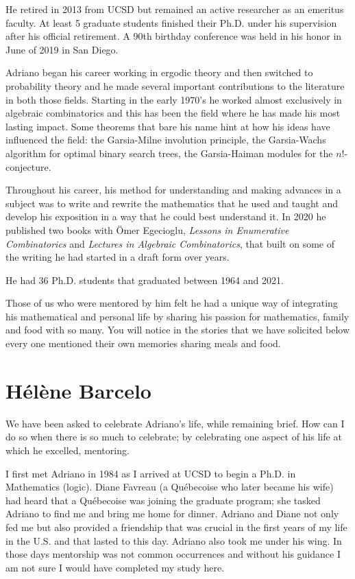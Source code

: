 \documentclass{notices}
\begin{document}
He retired in 2013 from UCSD but remained an active researcher as an emeritus faculty.  At least 5 graduate students finished their Ph.D. under his supervision after his official retirement.  A 90th birthday conference was held in his honor in June of 2019 in San Diego.

Adriano began his career working in ergodic theory and then switched to probability theory and he made several important contributions to the literature in both those fields.  Starting in the early 1970's he worked almost exclusively in algebraic
combinatorics and this has been the field where he has made his most lasting impact.  Some theorems that bare his name hint at how his ideas have influenced the field: the Garsia-Milne involution principle, the Garsia-Wachs algorithm for optimal binary search trees, the Garsia-Haiman modules for the $n!$-conjecture.

Throughout his career, his method for understanding and making advances in a subject was to write and rewrite the mathematics that he used and taught and develop his exposition in a way that he could best understand it.  In 2020 he published two books with Ömer Egecioglu, {\it Lessons in Enumerative Combinatorics} and {\it Lectures in Algebraic Combinatorics}, that built on some of the writing he had started in a draft form over years.

He had 36 Ph.D. students that graduated between 1964 and 2021.

Those of us who were mentored by him felt he had a unique way of integrating his mathematical and personal life by sharing his passion for mathematics, family and food with so many.  You will notice in the stories that we have solicited below every one mentioned their own memories sharing meals and food.

\section*{H\'el\`ene Barcelo}

We have been asked to celebrate Adriano's life, while remaining brief. How can I do so when there is so much to celebrate; by celebrating one aspect of his life at which he excelled, mentoring.

I first met Adriano in 1984 as I arrived at UCSD to begin a Ph.D. in Mathematics (logic). Diane Favreau (a Qu\'ebecoise who later became his wife) had heard that a Qu\'ebecoise was joining the graduate program; she tasked Adriano to find me and bring me home for dinner. Adriano and Diane not only fed me but also provided a friendship that was crucial in the first years of my life in the U.S. and that lasted to this day. Adriano also took me under his wing. In those days mentorship was not common occurrences and without his guidance I am not sure I would have completed my study here.
\end{document}
